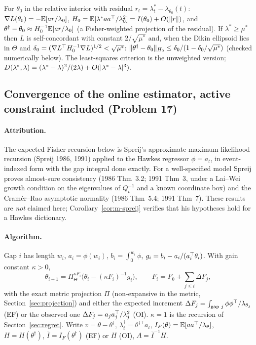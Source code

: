 \begin{proposition}\label{prop:m-local}\Ps{}
For $\theta_0$ in the relative interior with residual $r_t=\lambda^*_t-\lambda_{\theta_0}(t)$: $\nabla L(\theta_0)=-\mathbb{E}[ar/\lambda_0]$, $H_0=\mathbb{E}[\lambda^*aa^{\top}/\lambda_0^2]=I(\theta_0)+O(\lVert r\rVert)$, and $\theta^\dagger-\theta_0\approx H_0^{-1}\mathbb{E}[ar/\lambda_0]$ (a Fisher-weighted projection of the residual). If $\lambda^*\ge\mu^*$ then $L$ is self-concordant with constant $2/\sqrt{\mu^*}$ and, when the Dikin ellipsoid lies in $\Theta$ and $\delta_0=(\nabla L^{\top} H_0^{-1}\nabla L)^{1/2}<\sqrt{\mu^*}$: $\lVert \theta^\dagger-\theta_0\rVert_{H_0}\le\delta_0/(1-\delta_0/\sqrt{\mu^*})$ (checked numerically below). The least-squares criterion is the unweighted version; $D(\lambda^*,\lambda)=(\lambda^*-\lambda)^2/(2\lambda)+O(\lvert \lambda^*-\lambda\rvert^3)$.
\end{proposition}

\subsection{Convergence of the online estimator, active constraint included (Problem 17)}\label{sec:mis-online}

\paragraph{Attribution.} The expected-Fisher recursion below is Spreij's approximate-maximum-likelihood recursion (Spreij 1986, 1991) applied to the Hawkes regressor $\phi=a_t$, in event-indexed form with the gap integral done exactly.
For a well-specified model Spreij proves almost-sure consistency (1986 Thm~3.2; 1991 Thm~3, under a Lai--Wei growth condition on the eigenvalues of $Q_t^{-1}$ and a known coordinate box) and the Cram\'er--Rao asymptotic normality (1986 Thm~5.4; 1991 Thm~7).
These results are \emph{not} claimed here; Corollary~\ref{cor:m-spreij} verifies that his hypotheses hold for a Hawkes dictionary.

\paragraph{Algorithm.} Gap $i$ has length $w_i$, $a_i=\phi(w_i)$, $b_i=\int_0^{w_i}\phi$, $g_i=b_i-a_i/(a_i^{\top}\theta_i)$. With gain constant $\kappa>0$,
\[
\theta_{i+1}=\Pi^{\kappa F_i}_\Theta\big(\theta_i-(\kappa F_i)^{-1}g_i\big),\qquad F_i=F_0+\sum_{j\le i}\Delta F_j,
\]
with the exact metric projection $\Pi$ (non-expansive in the metric, Section~\ref{sec:projection}) and either the expected increment $\Delta F_j=\int_{\text{gap }j}\phi\phi^{\top}/\lambda_{\theta_j}$ (EF) or the observed one $\Delta F_j=a_ja_j^{\top}/\lambda_j^2$ (OI). $\kappa=1$ is the recursion of Section~\ref{sec:regret}.
Write $v=\theta-\theta^\dagger$, $\lambda^\dagger_t=\theta^{\dagger\top}a_t$, $I_F(\theta)=\mathbb{E}[aa^{\top}/\lambda_\theta]$, $H=H(\theta^\dagger)$, $\bar I=I_F(\theta^\dagger)$ (EF) or $H$ (OI), $A=\bar I^{-1}H$.

